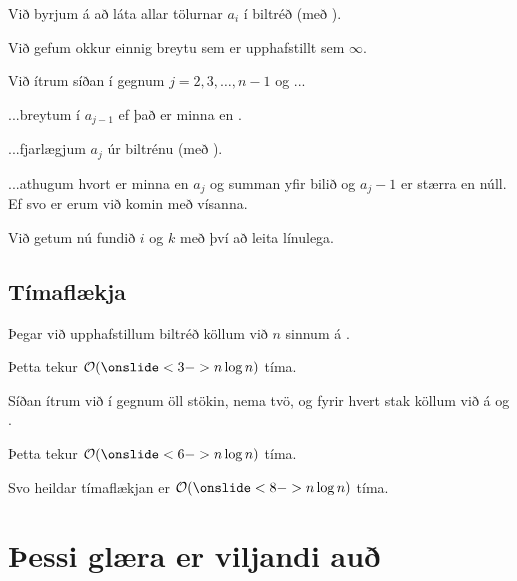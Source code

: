 {
	{
		\item<1-> Við byrjum á að láta allar tölurnar $a_i$ í biltréð (með ).
		\item<2-> Við gefum okkur einnig breytu  sem er upphafstillt sem $\infty$.
		\item<3-> Við ítrum síðan í gegnum $j = 2, 3, \dots, n - 1$ og ...
		{
			\item<4-> ...breytum  í $a_{j - 1}$ ef það er minna en .
			\item<5-> ...fjarlægjum $a_j$ úr biltrénu (með ).
			\item<6-> ...athugum hvort  er minna en $a_j$ og summan yfir bilið  og $a_j - 1$ er stærra en núll.
							Ef svo er erum við komin með vísanna.
		}
		\item<7-> Við getum nú fundið $i$ og $k$ með því að leita línulega.
	}
}

\subsection{Tímaflækja}
{
	{
		\item<1-> Þegar við upphafstillum biltréð köllum við $n$ sinnum á .
		\item<2-> Þetta tekur $\mathcal{O}(\onslide<3->{n \log n})$ tíma.
		\item<4-> Síðan ítrum við í gegnum öll stökin, nema tvö, og fyrir hvert stak köllum við á  og .
		\item<5-> Þetta tekur $\mathcal{O}(\onslide<6->{n \log n})$ tíma.
		\item<7-> Svo heildar tímaflækjan er $\mathcal{O}(\onslide<8->{n \log n})$ tíma.
	}
}

\section{Þessi glæra er viljandi auð}
{
}


